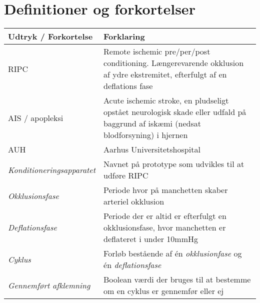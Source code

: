 	\section{Definitioner og forkortelser}
	\begin{longtable}{ |p{} |p{}| } 
		\hline
		\textbf{Udtryk / Forkortelse} &  \textbf{Forklaring} \\
		\hline
		RIPC & Remote ischemic pre/per/post conditioning. Længerevarende okklusion af ydre ekstremitet, efterfulgt af en deflations fase\\
		\hline
		AIS / apopleksi & Acute ischemic stroke, en pludseligt opstået neurologisk skade eller udfald på baggrund af iskæmi (nedsat blodforsyning) i hjernen \\
		\hline
		AUH & Aarhus Universitetshospital \\
		\hline
		\textit{Konditioneringsapparatet} & Navnet på prototype som udvikles til at udføre RIPC \\
		\hline
		\textit{Okklusionsfase} & Periode hvor på manchetten skaber arteriel okklusion \\
		\hline
		\textit{Deflationsfase} & Periode der er altid er efterfulgt en okklusionsfase, hvor manchetten er deflateret i under 10mmHg\\
		\hline
		\textit{Cyklus} & Forløb bestående af én \textit{okklusionfase} og én \textit{deflationsfase} \\
		\hline
		\textit{Gennemført afklemning} & Boolean værdi der bruges til at bestemme om en cyklus er gennemfør eller ej \\
		\hline
	\end{longtable}
	
